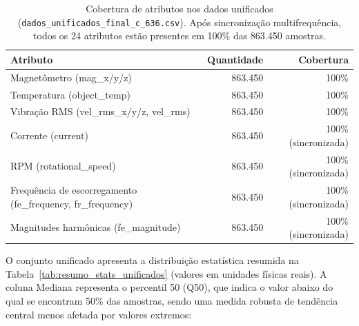\begin{table}[H]
  \centering
  \small
  \begin{tabular}{|l|r|r|}
    \hline
    \textbf{Atributo}                                           & \textbf{Quantidade} & \textbf{Cobertura}   \\
    \hline
    Magnetômetro (mag\_x/y/z)                                   & 863.450             & 100\%                \\
    Temperatura (object\_temp)                                  & 863.450             & 100\%                \\
    Vibração RMS (vel\_rms\_x/y/z, vel\_rms)                    & 863.450             & 100\%                \\
    Corrente (current)                                          & 863.450             & 100\% (sincronizada) \\
    RPM (rotational\_speed)                                     & 863.450             & 100\% (sincronizada) \\
    Frequência de escorregamento (fe\_frequency, fr\_frequency) & 863.450             & 100\% (sincronizada) \\
    Magnitudes harmônicas (fe\_magnitude)                       & 863.450             & 100\% (sincronizada) \\
    \hline
  \end{tabular}
  \caption{Cobertura de atributos nos dados unificados (\texttt{dados\_\allowbreak unificados\_\allowbreak final\_c\_\allowbreak 636.csv}). Após sincronização multifrequência, todos os 24 atributos estão presentes em 100\% das 863.450 amostras.}
  \label{tab:dados_unificados_cobertura}
\end{table}

O conjunto unificado apresenta a distribuição estatística resumida na Tabela~\ref{tab:resumo_stats_unificados} (valores em unidades físicas reais). A coluna Mediana representa o percentil 50 (Q50), que indica o valor abaixo do qual se encontram 50\% das amostras, sendo uma medida robusta de tendência central menos afetada por valores extremos:

